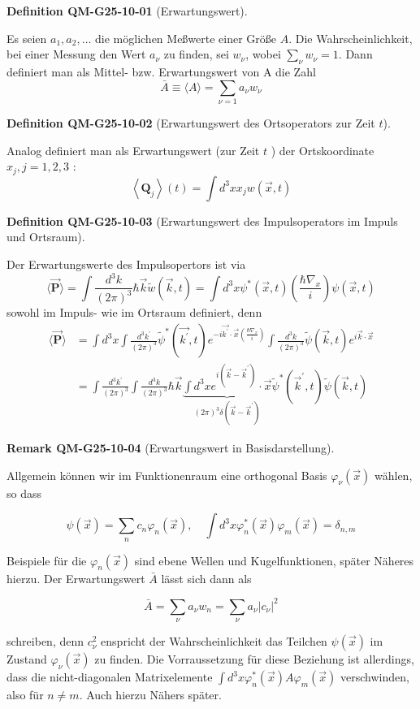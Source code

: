 \documentclass[10pt, letterpaper]{article}
\newcommand{\CustomHeading}[3]{%
  \par\medskip\noindent%
  \textbf{#1 #2} \textnormal{(#3)}.\enskip%
}
\newenvironment{DEF}[2]{\CustomHeading{Definition}{#1}{#2}}{}
\newenvironment{REM}[2]{\CustomHeading{Remark}{#1}{#2}}{}
\begin{document}
\begin{DEF}{QM-G25-10-01}{Erwartungswert}
Es seien $a_{1}, a_{2}, \ldots$ die möglichen Meßwerte einer Größe $A$. Die Wahrscheinlichkeit, bei einer Messung den Wert $a_{\nu}$ zu finden, sei $w_{\nu}$, wobei $\sum_{\nu} w_{\nu}=1$. Dann definiert man als Mittel- bzw. Erwartungswert von A die Zahl
$$
\bar{A} \equiv\langle A\rangle=\sum_{\nu=1} a_{\nu} w_{\nu}
$$
\end{DEF}

\begin{DEF}{QM-G25-10-02}{Erwartungswert des Ortsoperators zur Zeit $t$}
Analog definiert man als Erwartungswert (zur Zeit $t$ ) der Ortskoordinate $x_{j}, j=1,2,3$ :
$$
\left\langle\mathbf{Q}_{j}\right\rangle(t)=\int d^{3} x x_{j} w(\vec{x}, t)
$$
\end{DEF}

\begin{DEF}{QM-G25-10-03}{Erwartungswert des Impulsoperators im Impuls und Ortsraum}
Der Erwartungswerte des Impulsopertors ist via
$$
\langle\overrightarrow{\mathbf{P}}\rangle=\int \frac{d^{3} k}{(2 \pi)^{3}} \hbar \vec{k} \tilde{w}(\vec{k}, t)=\int d^{3} x \psi^{*}(\vec{x}, t)\left(\frac{\hbar \nabla_{x}}{i}\right) \psi(\vec{x}, t)
$$
sowohl im Impuls- wie im Ortsraum definiert, denn
$$
\begin{aligned}
\langle\overrightarrow{\mathbf{P}}\rangle & =\int d^{3} x \int \frac{d^{3} k^{\prime}}{(2 \pi)^{3}} \tilde{\psi}^{*}\left(\overrightarrow{k^{\prime}}, t\right) e^{-i \overrightarrow{k^{\prime}} \cdot \vec{x}\left(\frac{\hbar \nabla_{x}}{i}\right)} \int \frac{d^{3} k}{(2 \pi)^{3}} \tilde{\psi}(\vec{k}, t) e^{i \vec{k} \cdot \vec{x}} \\
& =\int \frac{d^{3} k^{\prime}}{(2 \pi)^{3}} \int \frac{d^{3} k}{(2 \pi)^{3}} \hbar \vec{k} \underbrace{\int d^{3} x e^{i\left(\vec{k}-\vec{k}^{\prime}\right)} \cdot \vec{x}}_{(2 \pi)^{3} \delta\left(\vec{k}-\vec{k}^{\prime}\right)} \tilde{\psi}^{*}\left(\vec{k}^{\prime}, t\right) \tilde{\psi}(\vec{k}, t)
\end{aligned}
$$
\end{DEF}

\begin{REM}{QM-G25-10-04}{Erwartungswert in Basisdarstellung}
Allgemein können wir im Funktionenraum eine orthogonal Basis $\varphi_{\nu}(\vec{x})$ wählen, so dass

$$
\psi(\vec{x})=\sum_{n} c_{n} \varphi_{n}(\vec{x}), \quad \int d^{3} x \varphi_{n}^{*}(\vec{x}) \varphi_{m}(\vec{x})=\delta_{n, m}
$$

Beispiele für die $\varphi_{n}(\vec{x})$ sind ebene Wellen und Kugelfunktionen, später Näheres hierzu. Der Erwartungswert $\bar{A}$ lässt sich dann als

$$
\bar{A}=\sum_{\nu} a_{\nu} w_{n}=\sum_{\nu} a_{\nu}\left|c_{\nu}\right|^{2}
$$

schreiben, denn $c_{\nu}^{2}$ enspricht der Wahrscheinlichkeit das Teilchen $\psi(\vec{x})$ im Zustand $\varphi_{\nu}(\vec{x})$ zu finden. Die Vorraussetzung für diese Beziehung ist allerdings, dass die nicht-diagonalen Matrixelemente $\int d^{3} x \varphi_{n}^{*}(\vec{x}) A \varphi_{m}(\vec{x})$ verschwinden, also für $n \neq m$. Auch hierzu Nähers später.
\end{REM}
\end{document}
